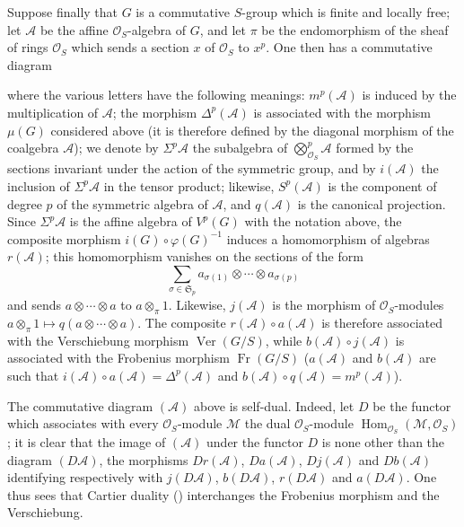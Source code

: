 Suppose finally that \(G\) is a commutative \(S\)-group which is
finite and locally free; let \(\mathcal A\) be the affine
\(\mathcal O_S\)-algebra of \(G\), and let \(\pi\) be the endomorphism
of the sheaf of rings \(\mathcal O_S\) which sends a section \(x\) of
\(\mathcal O_S\) to \(x^p\). One then has a commutative diagram
\begin{center}
  \label{sga3:VIIA:4.3.3-cartier-duality-algebra-diagram}
  
\end{center}
where the various letters have the following meanings:
\(m^p(\mathcal A)\) is induced by the multiplication of \(\mathcal A\);
the morphism \(\Delta^p(\mathcal A)\) is associated with the morphism
\(\mu(G)\) considered above (it is therefore defined by the diagonal
morphism of the coalgebra \(\mathcal A\)); we denote by
\(\Sigma^p\mathcal A\) the subalgebra of
\(\bigotimes_{\mathcal O_S}^p\mathcal A\) formed by the sections
invariant under the action of the symmetric group, and by
\(i(\mathcal A)\) the inclusion of \(\Sigma^p\mathcal A\) in the tensor
product; likewise, \(S^p(\mathcal A)\) is the component of degree \(p\)
of the symmetric algebra of \(\mathcal A\), and \(q(\mathcal A)\) is the
canonical projection. Since \(\Sigma^p\mathcal A\) is the affine algebra
of \(V^p(G)\) with the notation above, the composite morphism
\(i(G)\circ\varphi(G)^{-1}\) induces a homomorphism of algebras
\(r(\mathcal A)\); this homomorphism vanishes on the sections of the
form
\[
  \sum_{\sigma\in\mathfrak S_p}
    a_{\sigma(1)}\otimes\cdots\otimes a_{\sigma(p)}
\]
and sends \(a\otimes\cdots\otimes a\) to \(a\otimes_\pi1\). Likewise,
\(j(\mathcal A)\) is the morphism of \(\mathcal O_S\)-modules
\(a\otimes_\pi1\mapsto q(a\otimes\cdots\otimes a)\). The composite
\(r(\mathcal A)\circ a(\mathcal A)\) is therefore associated with the
Verschiebung morphism \(\operatorname{Ver}(G/S)\), while
\(b(\mathcal A)\circ j(\mathcal A)\) is associated with the Frobenius
morphism \(\operatorname{Fr}(G/S)\) (\(a(\mathcal A)\) and
\(b(\mathcal A)\) are such that
\(i(\mathcal A)\circ a(\mathcal A)=\Delta^p(\mathcal A)\) and
\(b(\mathcal A)\circ q(\mathcal A)=m^p(\mathcal A)\)).

The commutative diagram \((\mathcal A)\) above is self-dual. Indeed,
let \(D\) be the functor which associates with every
\(\mathcal O_S\)-module \(\mathcal M\) the dual \(\mathcal O_S\)-module
\(\operatorname{Hom}_{\mathcal O_S}(\mathcal M,\mathcal O_S)\); it is
clear that the image of \((\mathcal A)\) under the functor \(D\) is none
other than the diagram \((D\mathcal A)\), the morphisms
\(Dr(\mathcal A)\), \(Da(\mathcal A)\), \(Dj(\mathcal A)\) and
\(Db(\mathcal A)\) identifying respectively with \(j(D\mathcal A)\),
\(b(D\mathcal A)\), \(r(D\mathcal A)\) and \(a(D\mathcal A)\). One thus
sees that Cartier duality () interchanges the Frobenius morphism
and the Verschiebung.

